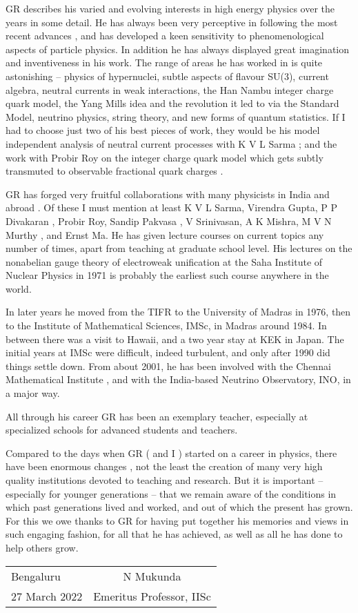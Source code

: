 GR describes his varied and evolving interests in high energy physics 
over the years in some detail. He has always been very perceptive in 
following the most recent advances , and has developed a keen 
sensitivity to phenomenological aspects of particle physics. In 
addition he has always displayed great imagination and inventiveness in 
his work. The range of areas he has worked in is quite astonishing – 
physics of hypernuclei, subtle aspects of flavour SU(3), current 
algebra, neutral currents in weak interactions, the Han Nambu integer 
charge quark model, the Yang Mills idea and the revolution it led to 
via the Standard Model, neutrino physics, string theory, and new forms 
of quantum statistics. If I had to choose just two of his best pieces 
of work, they would be his model independent analysis of neutral 
current processes with K V L Sarma ; and the work with Probir Roy on 
the integer charge quark model which gets subtly transmuted to 
observable fractional quark charges .
\medskip

GR has forged very fruitful collaborations with many physicists in 
India and abroad . Of these I must mention at least K V L Sarma, 
Virendra Gupta, P P Divakaran , Probir Roy, Sandip Pakvasa , V 
Srinivasan, A K Mishra, M V N Murthy , and Ernst Ma. He has given 
lecture courses on current topics any number of times, apart from 
teaching at graduate school level. His lectures on the nonabelian gauge 
theory of electroweak unification at the Saha Institute of Nuclear 
Physics in 1971 is probably the earliest such course anywhere in the 
world.
\medskip

In later years he moved from the TIFR to the University of Madras in 
1976, then to the Institute of Mathematical Sciences, IMSc, in Madras 
around 1984. In between there was a visit to Hawaii, and a two year 
stay at KEK in Japan. The initial years at IMSc were difficult, indeed 
turbulent, and only after 1990 did things settle down. From about 2001, 
he has been involved with the Chennai Mathematical Institute , and with 
the India-based Neutrino Observatory, INO, in a major way.
\medskip

All through his career GR has been an exemplary teacher, especially at 
specialized schools for advanced students and teachers.  
\smallskip

Compared to the days when GR ( and I ) started on a career in physics, 
there have been enormous changes , not the least the creation of many 
very high quality institutions devoted to teaching and research. But it 
is important – especially for younger generations – that we remain 
aware of the conditions in which past generations lived and worked, 
and out of which the present has grown. For this we owe thanks to GR 
for having put together his memories and views in such engaging fashion, 
for all that he has achieved, as well as all he has done to help 
others grow.
\vskip 1cm

\begin{flushleft}
\begin{tabular}{l@{\phantom{WWWWWWWWW}}c}
Bengaluru & \quad N Mukunda\\
27 March 2022 & Emeritus Professor, IISc
\end{tabular}
\end{flushleft}
